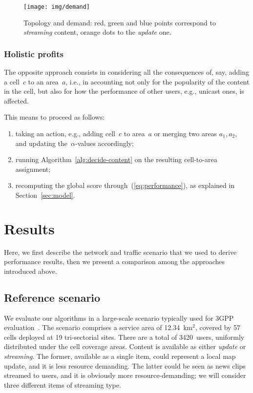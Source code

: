 \documentclass[10pt, conference, compsocconf]{IEEEtran}
\numberwithin{equation}{section}
\begin{document}
\begin{figure}
\centering
\texttt{[image: img/demand]}
\caption{Topology and demand: red, green and blue points correspond to {\em streaming} content,
orange dots to the {\em update} one.
\label{fig:topology}}
\end{figure}


\subsubsection{Holistic profits}

The opposite approach consists in considering all the consequences of, say, adding a cell~$c$
to an area~$a$, i.e., in accounting not only  for the popularity of
the content in the cell, but also  for how
the performance of other users, e.g., unicast ones, is affected.

This means to proceed as follows:
\begin{enumerate}
\item taking an action, e.g., adding cell~$c$ to area~$a$ or merging two areas $a_1,a_2$,
and updating the~$\alpha$-values accordingly;
\item running Algorithm~\ref{alg:decide-content} on the resulting cell-to-area assignment;
\item recomputing the global score through~(\ref{eq:performance}), as explained in 
Section~\ref{sec:model}.
\end{enumerate}


\section{Results
\label{sec:results}
}

Here, we first describe the network and traffic scenario that we used
to derive performance results, then we present a  comparison among the
approaches introduced 
above. 

\subsection{Reference scenario}

We evaluate our algorithms in a large-scale scenario typically used for
3GPP evaluation~\cite{scenario}. The scenario comprises a service area
of 12.34~km$^2$, covered by 57 cells deployed at 19 tri-sectorial sites.
There are a total of 3420~users, uniformly distributed under the cell
coverage areas. Content is available as either {\em update} or 
{\em streaming}. The former, available as a single item, 
could represent a local map update, 
and it is less resource demanding. The latter could
be seen as news clips streamed to users, and it is obviously more
resource-demanding; we will consider three different items of streaming type.
\end{document}
